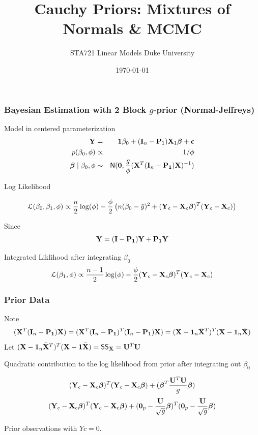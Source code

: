 \documentclass[handout]{beamer}\usepackage[]{graphicx}\usepackage[]{color}
\title{Cauchy Priors: Mixtures of Normals \& MCMC}
\institute{Merlise Clyde}
\author{STA721 Linear Models Duke University}
\date{\today}
\begin{document}
\maketitle



\begin{frame}[t]
  \frametitle{Bayesian Estimation with 2 Block $g$-prior (Normal-Jeffreys)}


Model in centered parameterization
\begin{eqnarray*}
\mathbf{Y} & = & \mathbf{1} \beta_0 + (\mathbf{I}_n - \mathbf{P}_1) \mathbf{X}_1 \boldsymbol{\beta} + \boldsymbol{\epsilon} \\
p(\beta_0, \phi) & \propto & 1/\phi\\
\boldsymbol{\beta} \mid \beta_0, \phi & \sim & \textsf{N}(\mathbf{0}, \frac{g}{\phi} (\mathbf{X}^T (\mathbf{I}_n - \mathbf{P}_{\mathbf{1}}) \mathbf{X})^{-1})
\end{eqnarray*}

Log Likelihood

$${\cal{L}}(\beta_0, \beta_1, \phi) \propto
\frac{n}{2}\log(\phi) - \frac{\phi}{2} \left(
  n (\beta_0 - \bar{y})^2
+ (\mathbf{Y}_c - \mathbf{X}_c \boldsymbol{\beta})^T(\mathbf{Y}_c - \mathbf{X}_c)\right)$$

Since
$$\mathbf{Y} = (\mathbf{I} - \mathbf{P}_{\mathbf{1}})\mathbf{Y}  + \mathbf{P}_{\mathbf{1}}\mathbf{Y}$$

Integrated Liklihood after integrating $\beta_0$
$${\cal{L}}(\beta_1, \phi) \propto
\frac{n -1}{2}\log(\phi)
- \frac{\phi}{2} (\mathbf{Y}_c - \mathbf{X}_c \boldsymbol{\beta})^T(\mathbf{Y}_c - \mathbf{X}_c)$$

\end{frame}

\begin{frame}\frametitle{Prior Data}
Note $$(\mathbf{X}^T (\mathbf{I}_n - \mathbf{P}_{\mathbf{1}}) \mathbf{X}) = (\mathbf{X}^T (\mathbf{I}_n - \mathbf{P}_{\mathbf{1}})^T (\mathbf{I}_n
- \mathbf{P}_{\mathbf{1}}) \mathbf{X})  = (\mathbf{X} -\mathbf{1}_n \bar{\mathbf{X}}^T)^T (\mathbf{X} - \mathbf{1}_n \bar{\mathbf{X}}) $$
\pause
Let  $(\mathbf{X} -\mathbf{1}_n \bar{\mathbf{X}}^T)^T (\mathbf{X} - \mathbf{1} \bar{\mathbf{X}}) = \textsf{SS}_{\mathbf{X}} = \mathbf{U}^T \mathbf{U}$
\pause

Quadratic contribution to the log likelihood from prior after integrating out $\beta_0$

$$ ( \mathbf{Y}_c  - \mathbf{X}_c \boldsymbol{\beta})^T(\mathbf{Y}_c - \mathbf{X}_c\boldsymbol{\beta}) + ( \boldsymbol{\beta}^T\frac{\mathbf{U}^T \mathbf{U}}{g} \boldsymbol{\beta})   $$
\pause
$$ ( \mathbf{Y}_c  - \mathbf{X}_c \boldsymbol{\beta})^T(\mathbf{Y}_c - \mathbf{X}_c\boldsymbol{\beta}) + ( \mathbf{0}_p -
\frac{\mathbf{U}}{\sqrt{g}}\boldsymbol{\beta})^T(\mathbf{0}_p -  \frac{\mathbf{U}}{\sqrt{g}} \boldsymbol{\beta})   $$

Prior observations  with $Yc =  0$.
\end{frame}
\end{document}
